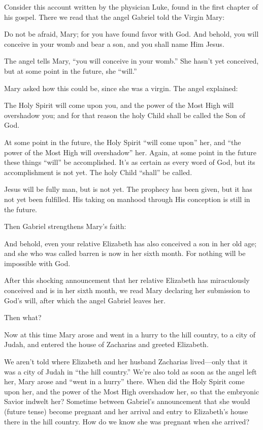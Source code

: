 \documentclass[
]{book}
\begin{document}
Consider this account written by the physician Luke, found in the first chapter of his gospel. There we read that the angel Gabriel told the Virgin Mary:

Do not be afraid, Mary; for you have found favor with God. And behold, you will conceive in your womb and bear a son, and you shall name Him Jesus.

The angel tells Mary, ``you will conceive in your womb.'' She hasn't yet conceived, but at some point in the future, she ``will.''

Mary asked how this could be, since she was a virgin. The angel explained:

The Holy Spirit will come upon you, and the power of the Most High will overshadow you; and for that reason the holy Child shall be called the Son of God.

At some point in the future, the Holy Spirit ``will come upon'' her, and ``the power of the Most High will overshadow'' her. Again, at some point in the future these things ``will'' be accomplished. It's as certain as every word of God, but its accomplishment is not yet. The holy Child ``shall'' be called.

Jesus will be fully man, but is not yet. The prophecy has been given, but it has not yet been fulfilled. His taking on manhood through His conception is still in the future.

Then Gabriel strengthens Mary's faith:

And behold, even your relative Elizabeth has also conceived a son in her old age; and she who was called barren is now in her sixth month. For nothing will be impossible with God.

After this shocking announcement that her relative Elizabeth has miraculously conceived and is in her sixth month, we read Mary declaring her submission to God's will, after which the angel Gabriel leaves her.

Then what?

Now at this time Mary arose and went in a hurry to the hill country, to a city of Judah, and entered the house of Zacharias and greeted Elizabeth.

We aren't told where Elizabeth and her husband Zacharias lived---only that it was a city of Judah in ``the hill country.'' We're also told as soon as the angel left her, Mary arose and ``went in a hurry'' there. When did the Holy Spirit come upon her, and the power of the Most High overshadow her, so that the embryonic Savior indwelt her? Sometime between Gabriel's announcement that she would (future tense) become pregnant and her arrival and entry to Elizabeth's house there in the hill country. How do we know she was pregnant when she arrived?
\end{document}
